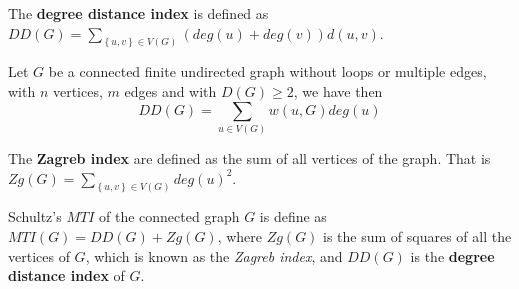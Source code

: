 

\begin{defn}\rm 
\cite{ddu} The \textbf{degree distance index} is defined as $DD(G)=\sum_{\left\lbrace u,v \right\rbrace \in V(G)} (deg(u)+deg(v))d(u,v)$.
\label{sec:dd(g)}
\end{defn}

\begin{thm}\rm
\cite{esalih} Let $G$ be a connected finite undirected graph without loops or multiple edges, with $n$ vertices, $m$ edges and with $D(G)\geq2$, we have then $$DD(G)=\sum_{u\in V(G)} w(u,G)deg(u)$$ 
\label{sec:dd_wiener}
\end{thm}

\begin{defn}\rm 
\cite{wien_schultz_mti} The \textbf{Zagreb index} are defined as the sum of all vertices of the graph. That is $Zg(G)=\sum_{\left\lbrace u,v \right\rbrace \in V(G)} deg(u)^2$.
\label{sec:m1(g)}
\end{defn}

\begin{defn}\rm
\cite{wien_schultz_mti} Schultz's $MTI$ of the connected graph $G$ is define as $MTI(G)=DD(G)+Zg(G)$, where $Zg(G)$ is the sum of squares of all the vertices of $G$, which is known as the \textit{Zagreb index}, and $DD(G)$ is the \textbf{degree distance index} of $G$. 
\label{sec:s_mti}
\end{defn}

